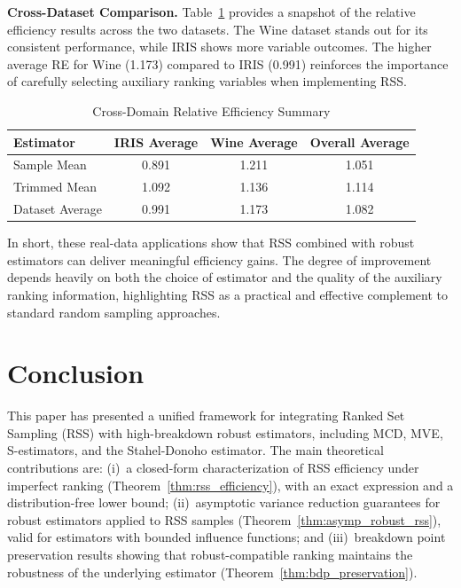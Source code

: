 \documentclass[12pt]{article}
\makeatletter
\let\oldparagraph\paragraph
\renewcommand{\paragraph}{
    \@ifstarcorollary
      \xxxParagraphStar
      \xxxParagraphNoStar
  }
\newcommand{\xxxParagraphStar}[1]{\oldparagraph*{#1}\mbox{}}
\newcommand{\xxxParagraphNoStar}[1]{\oldparagraph{#1}\mbox{}}
\makeatother
\begin{document}
{\bf Cross-Dataset Comparison.}
Table~\ref{tab:cross_domain} provides a snapshot of the relative efficiency results across the two datasets. The Wine dataset stands out for its consistent performance, while IRIS shows more variable outcomes. The higher average RE for Wine (1.173) compared to IRIS (0.991) reinforces the importance of carefully selecting auxiliary ranking variables when implementing RSS.

\begin{table}[htbp]
\centering
\caption{Cross-Domain Relative Efficiency Summary}
\label{tab:cross_domain}
\begin{tabular}{l c c c}
\hline
Estimator & IRIS Average & Wine Average & Overall Average \\
\hline
Sample Mean & 0.891 & 1.211 & 1.051 \\
Trimmed Mean & 1.092 & 1.136 & 1.114 \\
\hline
Dataset Average & 0.991 & 1.173 & 1.082 \\
\hline
\end{tabular}
\end{table}

In short, these real-data applications show that RSS combined with robust estimators can deliver meaningful efficiency gains. The degree of improvement depends heavily on both the choice of estimator and the quality of the auxiliary ranking information, highlighting RSS as a practical and effective complement to standard random sampling approaches.

\section{Conclusion}\label{sec:conclusion}

This paper has presented a unified framework for integrating Ranked Set Sampling (RSS) with high-breakdown robust estimators, including MCD, MVE, S-estimators, and the Stahel-Donoho estimator. The main theoretical contributions are: (i)~a closed-form characterization of RSS efficiency under imperfect ranking (Theorem~\ref{thm:rss_efficiency}), with an exact expression and a distribution-free lower bound; (ii)~asymptotic variance reduction guarantees for robust estimators applied to RSS samples (Theorem~\ref{thm:asymp_robust_rss}), valid for estimators with bounded influence functions; and (iii)~breakdown point preservation results showing that robust-compatible ranking maintains the robustness of the underlying estimator (Theorem~\ref{thm:bdp_preservation}).
\end{document}
